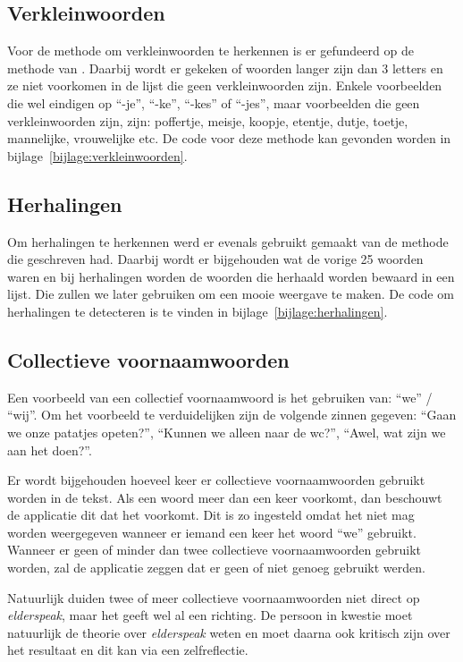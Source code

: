\subsection{Verkleinwoorden}
Voor de methode om verkleinwoorden te herkennen is er gefundeerd op de methode van \textcite{Standaert2021}. Daarbij wordt er gekeken of woorden langer zijn dan 3 letters en ze niet voorkomen in de lijst die geen verkleinwoorden zijn. Enkele voorbeelden die wel eindigen op ``-je'', ``-ke'', ``-kes'' of ``-jes'', maar voorbeelden die geen verkleinwoorden zijn, zijn: poffertje, meisje, koopje, etentje, dutje, toetje, mannelijke, vrouwelijke etc. De code voor deze methode kan gevonden worden in bijlage~\ref{bijlage:verkleinwoorden}.

\subsection{Herhalingen}
Om herhalingen te herkennen werd er evenals gebruikt gemaakt van de methode die \textcite{Standaert2021} geschreven had. Daarbij wordt er bijgehouden wat de vorige 25 woorden waren en bij herhalingen worden de woorden die herhaald worden bewaard in een lijst. Die zullen we later gebruiken om een mooie weergave te maken.
De code om herhalingen te detecteren is te vinden in bijlage~\ref{bijlage:herhalingen}.

\subsection{Collectieve voornaamwoorden}
Een voorbeeld van een collectief voornaamwoord is het gebruiken van: ``we'' / ``wij''. Om het voorbeeld te verduidelijken zijn de volgende zinnen gegeven: ``Gaan we onze patatjes opeten?'', ``Kunnen we alleen naar de wc?'', ``Awel, wat zijn we aan het doen?''.

Er wordt bijgehouden hoeveel keer er collectieve voornaamwoorden gebruikt worden in de tekst. Als een woord meer dan een keer voorkomt, dan beschouwt de applicatie dit dat het voorkomt. Dit is zo ingesteld omdat het niet mag worden weergegeven wanneer er iemand een keer het woord ``we'' gebruikt.
Wanneer er geen of minder dan twee collectieve voornaamwoorden gebruikt worden, zal de applicatie zeggen dat er geen of niet genoeg gebruikt werden.

Natuurlijk duiden twee of meer collectieve voornaamwoorden niet direct op \textit{elderspeak}, maar het geeft wel al een richting. De persoon in kwestie moet natuurlijk de theorie over \textit{elderspeak} weten en moet daarna ook kritisch zijn over het resultaat en dit kan via een zelfreflectie.


